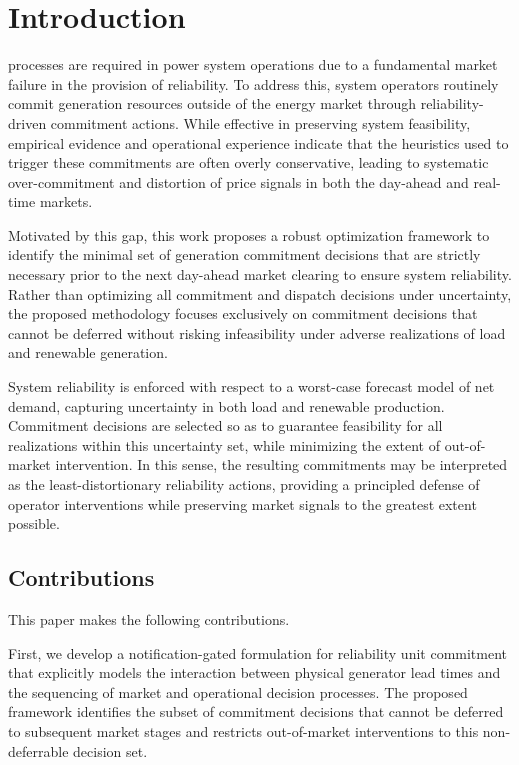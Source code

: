 \documentclass[journal]{IEEEtran}
\begin{document}
\IEEEpeerreviewmaketitle


\section{Introduction}

 processes are required in power system
operations due to a
fundamental market failure in the provision of reliability. To address
this, system operators routinely commit generation resources outside of
the energy market through reliability-driven commitment actions.
While effective in preserving system feasibility, empirical evidence
and operational experience indicate that the heuristics used to trigger
these commitments are often overly conservative, leading to systematic
over-commitment and distortion of price signals in both the day-ahead
and real-time markets.

Motivated by this gap, this work proposes a robust optimization
framework to identify the minimal set of generation commitment decisions
that are strictly necessary prior to the next day-ahead market clearing
to ensure system reliability. Rather than optimizing all commitment and
dispatch decisions under uncertainty, the proposed methodology focuses
exclusively on commitment decisions that cannot be deferred without
risking infeasibility under adverse realizations of load and renewable
generation.

System reliability is enforced with respect to a worst-case forecast
model of net demand, capturing uncertainty in both load and renewable
production. Commitment decisions are selected so as to guarantee
feasibility for all realizations within this uncertainty set, while
minimizing the extent of out-of-market intervention. In this sense, the
resulting commitments may be interpreted as the least-distortionary
reliability actions, providing a principled defense of operator
interventions while preserving market signals to the greatest extent
possible.

\subsection{Contributions}

This paper makes the following contributions.

First, we develop a notification-gated formulation for reliability unit
commitment that explicitly models the interaction between physical
generator lead times and the sequencing of market and operational
decision processes. The proposed framework identifies the subset of
commitment decisions that cannot be deferred to subsequent market stages
and restricts out-of-market interventions to this non-deferrable
decision set.
\end{document}
